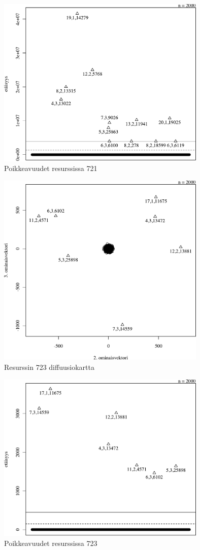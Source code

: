 \begin{figure}[p]
\centering
\includegraphics[width=10cm]{pics/tiheyskuvat/service_721.pdf}
\caption{Poikkeavuudet resurssissa 721}
\label{service_721}
\end{figure}

\begin{figure}[p]
\centering
\includegraphics[width=10cm]{pics/diffuusiokuvat/service_723.pdf}
\caption{Resurssin 723 diffuusiokartta}
\label{diffusio_723}
\end{figure}

\begin{figure}[p]
\centering
\includegraphics[width=10cm]{pics/tiheyskuvat/service_723.pdf}
\caption{Poikkeavuudet resurssissa 723}
\label{service_723}
\end{figure}

